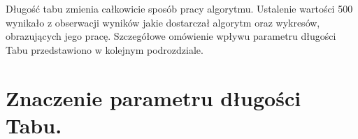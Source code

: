 Długość tabu zmienia całkowicie sposób pracy algorytmu. Ustalenie wartości 500 wynikało z obserwacji wyników jakie dostarczał algorytm oraz wykresów, obrazujących jego pracę. Szczegółowe omówienie wpływu parametru długości Tabu przedstawiono w kolejnym podrozdziale.

\section{Znaczenie parametru długości Tabu.}

